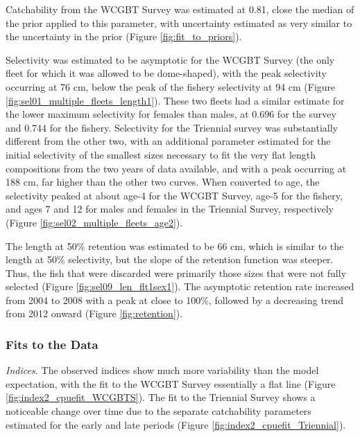 \documentclass[12pt,]{article}
\begin{document}
Catchability from the WCGBT Survey was estimated at 0.81, close the
median of the prior applied to this parameter, with uncertainty
estimated as very similar to the uncertainty in the prior (Figure
\ref{fig:fit_to_priors}).

Selectivity was estimated to be asymptotic for the WCGBT Survey (the
only fleet for which it was allowed to be dome-shaped), with the peak
selectivity occurring at 76 cm, below the peak of the fishery
selectivity at 94 cm (Figure \ref{fig:sel01_multiple_fleets_length1}).
These two fleets had a similar estimate for the lower maximum
selectivity for females than males, at 0.696 for the survey and 0.744
for the fishery. Selectivity for the Triennial survey was substantially
different from the other two, with an additional parameter estimated for
the initial selectivity of the smallest sizes necessary to fit the very
flat length compositions from the two years of data available, and with
a peak occurring at 188 cm, far higher than the other two curves. When
converted to age, the selectivity peaked at about age-4 for the WCGBT
Survey, age-5 for the fishery, and ages 7 and 12 for males and females
in the Triennial Survey, respectively (Figure
\ref{fig:sel02_multiple_fleets_age2}).

The length at 50\% retention was estimated to be 66 cm, which is similar
to the length at 50\% selectivity, but the slope of the retention
function was steeper. Thus, the fish that were discarded were primarily
those sizes that were not fully selected (Figure
\ref{fig:sel09_len_flt1sex1}). The asymptotic retention rate increased
from 2004 to 2008 with a peak at close to 100\%, followed by a
decreasing trend from 2012 onward (Figure \ref{fig:retention}).

\hypertarget{fits-to-the-data}{%
\subsubsection{Fits to the Data}\label{fits-to-the-data}}

\emph{Indices.} The observed indices show much more variability than the
model expectation, with the fit to the WCGBT Survey essentially a flat
line (Figure \ref{fig:index2_cpuefit_WCGBTS}). The fit to the Triennial
Survey shows a noticeable change over time due to the separate
catchability parameters estimated for the early and late periods (Figure
\ref{fig:index2_cpuefit_Triennial}).
\end{document}
